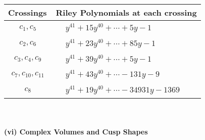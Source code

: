 \documentclass[1p]{elsarticle_modified}
\theoremstyle{definition}
\begin{document}
\begin{tabular}{m{50pt}|m{274pt}}
Crossings & \hspace{64pt}Riley Polynomials at each crossing \\
\hline $$\begin{aligned}c_{1},c_{5}\end{aligned}$$&$\begin{aligned}
&y^{41}+15 y^{40}+\cdots+5 y-1
\end{aligned}$\\
\hline $$\begin{aligned}c_{2},c_{6}\end{aligned}$$&$\begin{aligned}
&y^{41}+23 y^{40}+\cdots+85 y-1
\end{aligned}$\\
\hline $$\begin{aligned}c_{3},c_{4},c_{9}\end{aligned}$$&$\begin{aligned}
&y^{41}+39 y^{40}+\cdots+5 y-1
\end{aligned}$\\
\hline $$\begin{aligned}c_{7},c_{10},c_{11}\end{aligned}$$&$\begin{aligned}
&y^{41}+43 y^{40}+\cdots-131 y-9
\end{aligned}$\\
\hline $$\begin{aligned}c_{8}\end{aligned}$$&$\begin{aligned}
&y^{41}+19 y^{40}+\cdots-34931 y-1369
\end{aligned}$\\
\hline
\end{tabular}\\~\\
\newpage\flushleft \textbf{(vi) Complex Volumes and Cusp Shapes}
\end{document}
